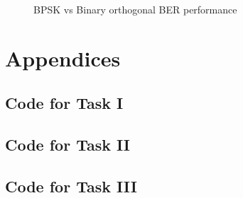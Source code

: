 \documentclass{article}
\begin{document}
        \begin{figure}[!htb]
                \centering
                \caption{BPSK vs Binary orthogonal BER performance}
        \end{figure}

        \newpage
        \printbibliography

        \newpage
        \section{Appendices}
        \subsection{Code for Task I}
        

        \newpage
        \subsection{Code for Task II}
        

        \newpage
        \subsection{Code for Task III}
                
\end{document}
